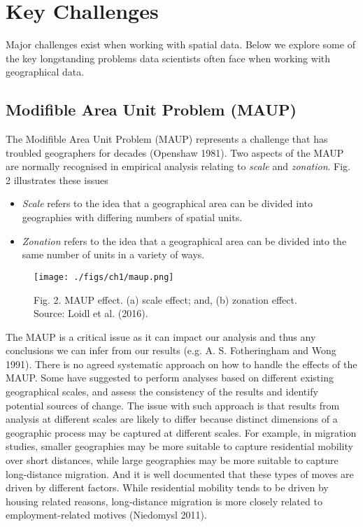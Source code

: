 \documentclass[
  letterpaper,
  krantz2]{style/krantz}
\begin{document}
\hypertarget{key-challenges}{%
\section{Key Challenges}\label{key-challenges}}

Major challenges exist when working with spatial data. Below we explore
some of the key longstanding problems data scientists often face when
working with geographical data.

\hypertarget{modifible-area-unit-problem-maup}{%
\subsection{Modifible Area Unit Problem
(MAUP)}\label{modifible-area-unit-problem-maup}}

The Modifible Area Unit Problem (MAUP) represents a challenge that has
troubled geographers for decades (Openshaw 1981). Two aspects of the
MAUP are normally recognised in empirical analysis relating to
\emph{scale} and \emph{zonation}. Fig. 2 illustrates these issues

\begin{itemize}
\item
  \emph{Scale} refers to the idea that a geographical area can be
  divided into geographies with differing numbers of spatial units.
\item
  \emph{Zonation} refers to the idea that a geographical area can be
  divided into the same number of units in a variety of ways.
\end{itemize}

\begin{figure}

{\centering \texttt{[image: ./figs/ch1/maup.png]}

}

\caption{Fig. 2. MAUP effect. (a) scale effect; and, (b) zonation
effect. Source: Loidl et al. (2016).}

\end{figure}

The MAUP is a critical issue as it can impact our analysis and thus any
conclusions we can infer from our results (e.g. A. S. Fotheringham and
Wong 1991). There is no agreed systematic approach on how to handle the
effects of the MAUP. Some have suggested to perform analyses based on
different existing geographical scales, and assess the consistency of
the results and identify potential sources of change. The issue with
such approach is that results from analysis at different scales are
likely to differ because distinct dimensions of a geographic process may
be captured at different scales. For example, in migration studies,
smaller geographies may be more suitable to capture residential mobility
over short distances, while large geographies may be more suitable to
capture long-distance migration. And it is well documented that these
types of moves are driven by different factors. While residential
mobility tends to be driven by housing related reasons, long-distance
migration is more closely related to employment-related motives
(Niedomysl 2011).
\end{document}
